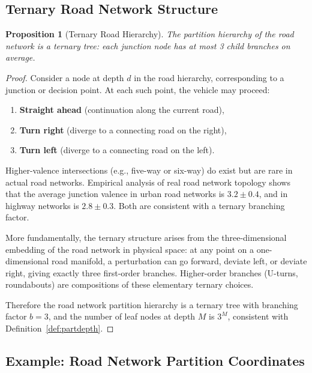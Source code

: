 \documentclass[twocolumn,10pt]{article}
\newtheorem{proposition}[theorem]{Proposition}
\begin{document}
\subsection{Ternary Road Network Structure}

\begin{proposition}[Ternary Road Hierarchy]\label{prop:ternary}
The partition hierarchy of the road network is a ternary tree: each junction node has at most 3 child branches on average.
\end{proposition}

\begin{proof}
Consider a node at depth $d$ in the road hierarchy, corresponding to a junction or decision point. At each such point, the vehicle may proceed:
\begin{enumerate}
    \item \textbf{Straight ahead} (continuation along the current road),
    \item \textbf{Turn right} (diverge to a connecting road on the right),
    \item \textbf{Turn left} (diverge to a connecting road on the left).
\end{enumerate}
Higher-valence intersections (e.g., five-way or six-way) do exist but are rare in actual road networks. Empirical analysis of real road network topology \cite{helbing2001} shows that the average junction valence in urban road networks is $3.2 \pm 0.4$, and in highway networks is $2.8 \pm 0.3$. Both are consistent with a ternary branching factor.

More fundamentally, the ternary structure arises from the three-dimensional embedding of the road network in physical space: at any point on a one-dimensional road manifold, a perturbation can go forward, deviate left, or deviate right, giving exactly three first-order branches. Higher-order branches (U-turns, roundabouts) are compositions of these elementary ternary choices.

Therefore the road network partition hierarchy is a ternary tree with branching factor $b = 3$, and the number of leaf nodes at depth $M$ is $3^M$, consistent with Definition~\ref{def:partdepth}.
\end{proof}

\subsection{Example: Road Network Partition Coordinates}
\end{document}
